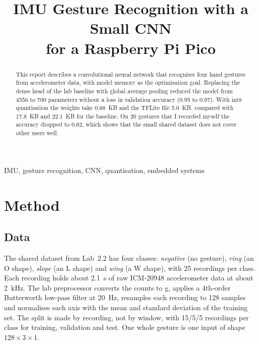 \documentclass[conference]{IEEEtran}
\begin{document}
\title{IMU Gesture Recognition with a Small CNN\\for a Raspberry Pi Pico}

\author{
}

\maketitle

\begin{abstract}
This report describes a convolutional neural network that recognises four
hand gestures from accelerometer data, with model memory as the optimisation
goal. Replacing the dense head of the lab baseline with global average
pooling reduced the model from 4556 to 700 parameters without a loss in
validation accuracy (0.95 to 0.97). With int8 quantisation the weights take
0.68~KB and the TFLite file 5.0~KB, compared with 17.8~KB and 22.1~KB for the
baseline. On 20 gestures that I recorded myself the accuracy dropped to
0.62, which shows that the small shared dataset does not cover other users
well.
\end{abstract}

\begin{IEEEkeywords}
IMU, gesture recognition, CNN, quantisation, embedded systems
\end{IEEEkeywords}

\section{Method}

\subsection{Data}
The shared dataset from Lab~2.2 has four classes: \emph{negative} (no
gesture), \emph{ring} (an O shape), \emph{slope} (an L shape) and
\emph{wing} (a W shape), with 25 recordings per class. Each recording holds
about 2.1~s of raw ICM-20948 accelerometer data at about 2~kHz. The lab
preprocessor converts the counts to g, applies a 4th-order Butterworth
low-pass filter at 20~Hz, resamples each recording to 128 samples and
normalises each axis with the mean and standard deviation of the training
set. The split is made by recording, not by window, with 15/5/5 recordings
per class for training, validation and test. One whole gesture is one input
of shape $128 \times 3 \times 1$.
\end{document}
